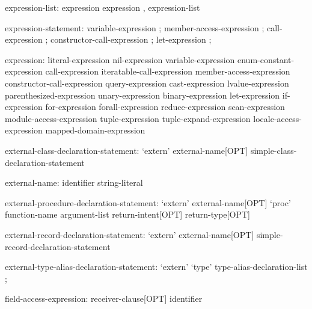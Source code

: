 \begin{syntax}
expression-list:
  expression
  expression , expression-list
\end{syntax}

\begin{syntax}
expression-statement:
  variable-expression ;
  member-access-expression ;
  call-expression ;
  constructor-call-expression ;
  let-expression ; 
\end{syntax}

\begin{syntax}
expression:
  literal-expression
  nil-expression
  variable-expression
  enum-constant-expression
  call-expression
  iteratable-call-expression
  member-access-expression
  constructor-call-expression
  query-expression
  cast-expression
  lvalue-expression
  parenthesized-expression
  unary-expression
  binary-expression
  let-expression
  if-expression
  for-expression
  forall-expression
  reduce-expression
  scan-expression
  module-access-expression
  tuple-expression
  tuple-expand-expression
  locale-access-expression
  mapped-domain-expression
\end{syntax}

\begin{syntax}
external-class-declaration-statement:
  `extern' external-name[OPT] simple-class-declaration-statement
\end{syntax}

\begin{syntax}
external-name:
  identifier
  string-literal
\end{syntax}

\begin{syntax}
external-procedure-declaration-statement:
  `extern' external-name[OPT] `proc' function-name argument-list return-intent[OPT] return-type[OPT]
\end{syntax}

\begin{syntax}
external-record-declaration-statement:
  `extern' external-name[OPT] simple-record-declaration-statement
\end{syntax}

\begin{syntax}
external-type-alias-declaration-statement:
  `extern' `type' type-alias-declaration-list ;
\end{syntax}

\begin{syntax}
field-access-expression:
  receiver-clause[OPT] identifier
\end{syntax}

